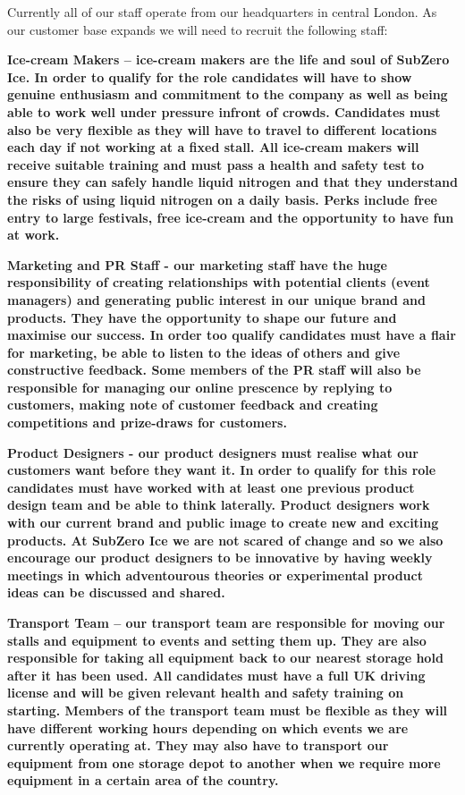 \documentclass{article}
\begin{document}
  Currently all of our staff operate from our headquarters in central London. As our customer base expands we will need to recruit the following staff:

 \bf{Ice-cream Makers} – ice-cream makers are the life and soul of SubZero Ice. In order to qualify for the role candidates will have to show genuine enthusiasm and commitment to the company as well as being able to work well under pressure infront of crowds. Candidates must also be very flexible as they will have to travel to different locations each day if not working at a fixed stall. All ice-cream makers will receive suitable training and must pass a health and safety test to ensure they can safely handle liquid nitrogen and that they understand the risks of using liquid nitrogen on a daily basis. Perks include free entry to large festivals, free ice-cream and the opportunity to have fun at work.

 \bf{Marketing and PR Staff} - our marketing staff have the huge responsibility of creating relationships with potential clients (event managers) and generating public interest in our unique brand and products. They have the opportunity to shape our future and maximise our success. In order too qualify candidates must have a flair for marketing, be able to listen to the ideas of others and give constructive feedback. Some members of the PR staff will also be responsible for managing our online prescence by replying to customers, making note of customer feedback and creating competitions and prize-draws for customers.

\bf{Product Designers} - our product designers must realise what our customers want before they want it. In order to qualify for this role candidates must have worked with at least one previous product design team and be able to think laterally. Product designers work with our current brand and public image to create new and exciting products. At SubZero Ice we are not scared of change and so we also encourage our product designers to be innovative by having weekly meetings in which adventourous theories or experimental product ideas can be discussed and shared.

\bf{Transport Team} – our transport team are responsible for moving our stalls and equipment to events and setting them up. They are also responsible for taking all equipment back to our nearest storage hold after it has been used. All candidates must have a full UK driving license and will be given relevant health and safety training on starting. Members of the transport team must be flexible as they will have different working hours depending on which events we are currently operating at. They may also have to transport our equipment from one storage depot to another when we require more equipment in a certain area of the country.
\end{document}
